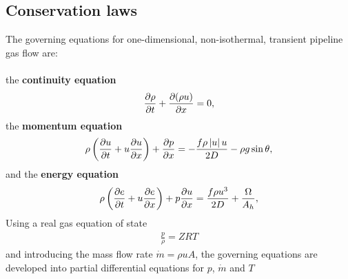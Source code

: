 \subsection{Conservation laws}
The governing equations for one-dimensional, non-isothermal, transient pipeline gas flow are: \\\\
the \textbf{continuity equation}
\begin{align}
    \pdt{\rho} + \pdx{(\rho u)} = 0
, \label{eq:contEq}
\end{align}
the \textbf{momentum equation} \cite{Daneshyar1976OneDimensional}
\begin{align}
    \rho\del{\pdt{u} + u \pdx{u}} + \pdx{p} = -\frac{f\rho \abs{u} u}{2D} - \rho g \sin \theta
, \label{eq:momEq}
\end{align}
and the \textbf{energy equation} \cite{White2006Viscous}
\begin{align}
    \rho\del{\pdt{e} + u\pdx{e}} + p\pdx{u} = \frac{f\rho u^3}{2D} + \frac{\Omega}{A_h}
, \label{eq:enEq}
\end{align}
Using a real gas equation of state
\begin{align}
    \frac{p}{\rho} = ZRT
\end{align}
and introducing the mass flow rate $\dot m = \rho u A$, the governing equations are developed into partial differential equations for $p$, $\dot m$ and $T$
